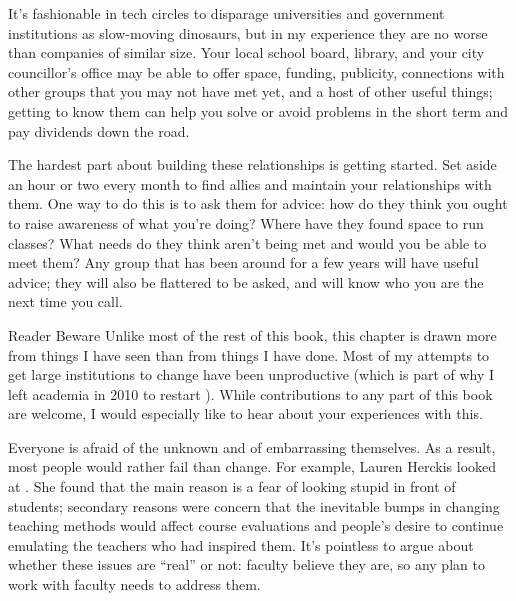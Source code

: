 
It's fashionable in tech circles
to disparage universities and government institutions as slow-moving dinosaurs,
but in my experience they are no worse than companies of similar size.
Your local school board, library, and your city councillor's office
may be able to offer space, funding, publicity,
connections with other groups that you may not have met yet,
and a host of other useful things;
getting to know them can help you solve or avoid problems in the short term
and pay dividends down the road.

The hardest part about building these relationships is getting started.
Set aside an hour or two every month
to find allies and maintain your relationships with them.
One way to do this is to ask them for advice:
how do they think you ought to raise awareness of what you're doing?
Where have they found space to run classes?
What needs do they think aren't being met
and would you be able to meet them?
Any group that has been around for a few years will have useful advice;
they will also be flattered to be asked,
and will know who you are the next time you call.

\begin{aside}{Reader Beware}
  Unlike most of the rest of this book,
  this chapter is drawn more from things I have seen than from things I have done.
  Most of my attempts to get large institutions to change have been unproductive
  (which is part of why I left academia in 2010
  to restart ).
  While contributions to any part of this book are welcome,
  I would especially like to hear about your experiences with this.
\end{aside}


Everyone is afraid of the unknown and of embarrassing themselves.
As a result,
most people would rather fail than change.
For example, Lauren Herckis looked at
.
She found that the main reason is a fear of looking stupid in front of students;
secondary reasons were
concern that the inevitable bumps in changing teaching methods would affect course evaluations
and people's desire to continue emulating the teachers who had inspired them.
It's pointless to argue about whether these issues are ``real'' or not:
faculty believe they are,
so any plan to work with faculty needs to address them.

